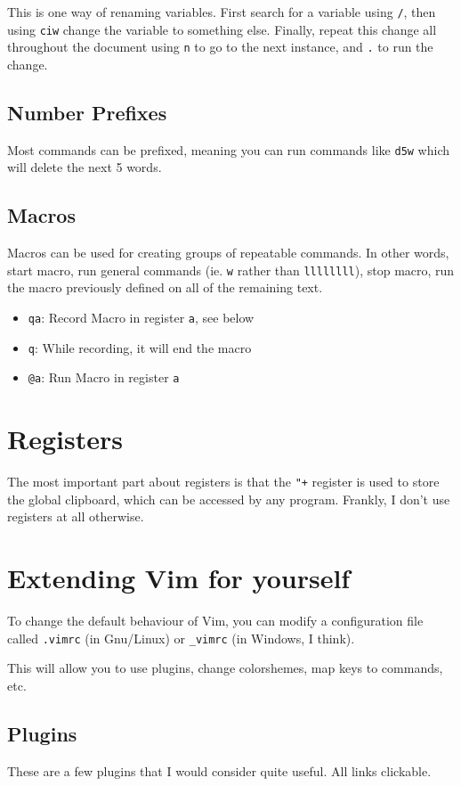 \documentclass[11pt]{article}
\begin{document}
This is one way of renaming variables. First search for a variable using \texttt{/},
then using \texttt{ciw} change the variable to something else. Finally, repeat this
change all throughout the document using \texttt{n} to go to the next instance, and \texttt{.}
to run the change.
\subsection{Number Prefixes}
\label{sec:org662f026}
Most commands can be prefixed, meaning you can run commands like \texttt{d5w} which
will delete the next 5 words.
\subsection{Macros}
\label{sec:org8e362a8}
Macros can be used for creating groups of repeatable commands. In other words,
start macro, run general commands (ie. \texttt{w} rather than \texttt{llllllll}), stop macro,
run the macro previously defined on all of the remaining text.

\begin{itemize}
\item \texttt{qa}: Record Macro in register \texttt{a}, see below
\item \texttt{q}: While recording, it will end the macro
\item \texttt{@a}: Run Macro in register \texttt{a}
\end{itemize}
\section{Registers}
\label{sec:org7c462b6}
The most important part about registers is that the \texttt{"+} register is used to
store the global clipboard, which can be accessed by any program. Frankly, I
don't use registers at all otherwise.
\section{Extending Vim for yourself}
\label{sec:orgca167bd}
To change the default behaviour of Vim, you can modify a configuration file
called \texttt{.vimrc} (in Gnu/Linux) or \texttt{\_vimrc} (in Windows, I think).

This will allow you to use plugins, change colorshemes, map keys to commands,
etc.

\subsection{Plugins}
\label{sec:org6d0c83c}
These are a few plugins that I would consider quite useful. All links clickable.
\end{document}

